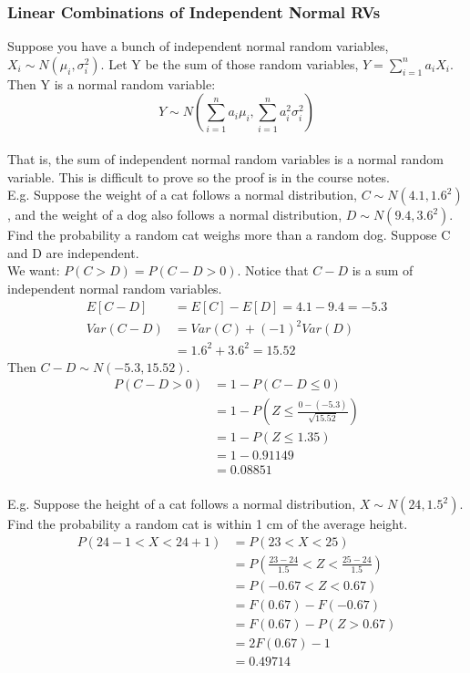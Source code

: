 \documentclass[12pt, letterpaper]{article}
\begin{document}
\subsubsection{Linear Combinations of Independent Normal RVs}
Suppose you have a bunch of independent normal random variables, $X_i \sim N(\mu_i, \sigma_i^2)$. Let Y be the sum of those random variables, $Y = \sum\limits_{i = 1}^{n} a_iX_i$. Then Y is a normal random variable:
\begin{equation}
Y \sim N\left(\sum_{i = 1}^{n} a_i \mu_i, \sum_{i = 1}^{n} a_i^2 \sigma_i^2\right)
\end{equation}\\

That is, the sum of independent normal random variables is a normal random variable. This is difficult to prove so the proof is in the course notes.\\

E.g. Suppose the weight of a cat follows a normal distribution, $C \sim N(4.1, 1.6^2)$, and the weight of a dog also follows a normal distribution, $D \sim N(9.4, 3.6^2)$. Find the probability a random cat weighs more than a random dog. Suppose C and D are independent.\\

We want: $P\left(C > D\right) = P\left(C - D > 0\right)$. Notice that $C - D$ is a sum of independent normal random variables.
\begin{align*}
E[C - D] &= E[C] - E[D] = 4.1 - 9.4 = -5.3\\
Var\left(C - D\right) &= Var\left(C\right) + (-1)^2 Var\left(D\right)\\
&= 1.6^2 + 3.6^2 = 15.52
\end{align*}
Then $C - D \sim N(-5.3, 15.52)$.
\begin{align*}
P\left(C - D > 0\right) &= 1 - P\left(C - D \leq 0\right)\\
&= 1 - P\left(Z \leq \frac{0 - (-5.3)}{\sqrt{15.52}}\right)\\
&= 1 - P\left(Z \leq 1.35\right)\\
&= 1 - 0.91149\\
&= 0.08851
\end{align*}\\

E.g. Suppose the height of a cat follows a normal distribution, $X \sim N(24, 1.5^2)$. Find the probability a random cat is within 1 cm of the average height.
\begin{align*}
P\left(24 - 1 < X < 24 + 1\right) &= P\left(23 < X < 25\right)\\
&= P\left(\frac{23 - 24}{1.5} < Z < \frac{25 - 24}{1.5}\right)\\
&= P\left(-0.67 < Z < 0.67\right)\\
&= F(0.67) - F(-0.67)\\
&= F(0.67) - P\left(Z > 0.67\right)\\
&= 2F(0.67) - 1\\
&= 0.49714
\end{align*}\\
\end{document}

